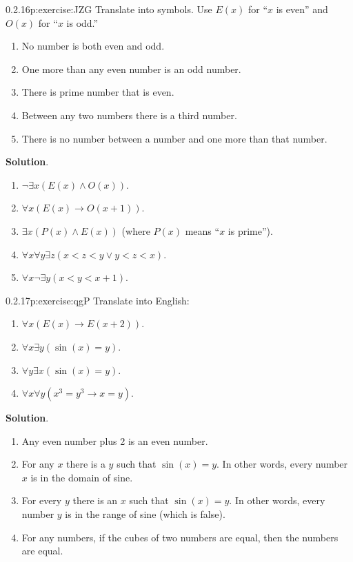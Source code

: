 \documentclass[twoside,11pt,]{book}
\newcommand{\blocktitlefont}{\relax}
\numberwithin{equation}{chapter}
\newcommand{\imp}{\rightarrow}
\newcommand{\lt}{<}
\begin{document}
\begin{divisionsolution}{0.2.16}{}{p:exercise:JZG}%
Translate into symbols. Use \(E(x)\) for ``\(x\) is even'' and \(O(x)\) for ``\(x\) is odd.''%
\begin{enumerate}[label=(\alph*)]
\item{}No number is both even and odd.%
\item{}One more than any even number is an odd number.%
\item{}There is prime number that is even.%
\item{}Between any two numbers there is a third number.%
\item{}There is no number between a number and one more than that number.%
\end{enumerate}
%
\par\smallskip%
\noindent\textbf{\blocktitlefont Solution}.\quad{}%
\begin{enumerate}[label=(\alph*)]
\item{}\(\neg \exists x (E(x) \wedge O(x))\).%
\item{}\(\forall x (E(x) \imp O(x+1))\).%
\item{}\(\exists x(P(x) \wedge E(x))\) (where \(P(x)\) means ``\(x\) is prime'').%
\item{}\(\forall x \forall y \exists z(x \lt z \lt y \vee y \lt z \lt x)\).%
\item{}\(\forall x \neg \exists y (x \lt y \lt x+1)\).%
\end{enumerate}
%
\end{divisionsolution}%
\begin{divisionsolution}{0.2.17}{}{p:exercise:qgP}%
Translate into English:%
\begin{enumerate}[label=(\alph*)]
\item{}\(\forall x (E(x) \imp E(x +2))\).%
\item{}\(\forall x \exists y (\sin(x) = y)\).%
\item{}\(\forall y \exists x (\sin(x) = y)\).%
\item{}\(\forall x \forall y (x^3 = y^3 \imp x = y)\).%
\end{enumerate}
%
\par\smallskip%
\noindent\textbf{\blocktitlefont Solution}.\quad{}%
\begin{enumerate}[label=(\alph*)]
\item{}Any even number plus 2 is an even number.%
\item{}For any \(x\) there is a \(y\) such that \(\sin(x) = y\). In other words, every number \(x\) is in the domain of sine.%
\item{}For every \(y\) there is an \(x\) such that \(\sin(x) = y\). In other words, every number \(y\) is in the range of sine (which is false).%
\item{}For any numbers, if the cubes of two numbers are equal, then the numbers are equal.%
\end{enumerate}
%
\end{divisionsolution}%
\end{document}
